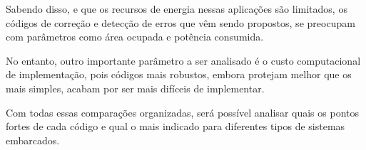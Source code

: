 Sabendo disso, e que os recursos de energia nessas aplicações são limitados, os códigos de correção e detecção de erros que vêm sendo propostos, se preocupam com parâmetros como área ocupada e potência consumida.

No entanto, outro importante parâmetro a ser analisado é o custo computacional de implementação, pois códigos mais robustos, embora protejam melhor que os mais simples, acabam por ser mais difíceis de implementar.

Com todas essas comparações organizadas, será possível analisar quais os pontos fortes de cada código e qual o mais indicado para diferentes tipos de sistemas embarcados.